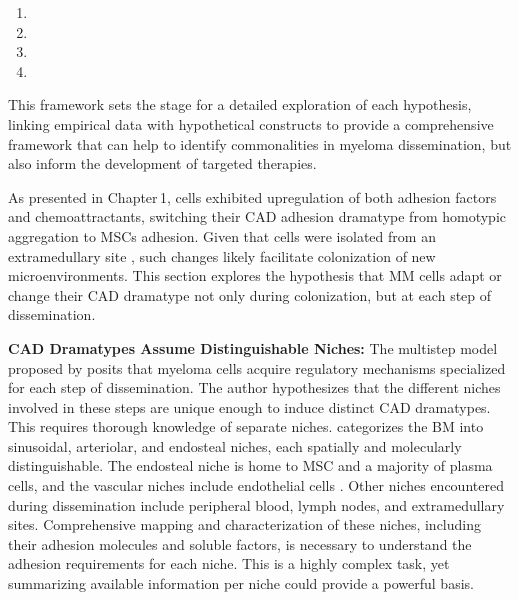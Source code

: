 \begin{enumerate}[parsep=4pt]
      \item \caddramatype
      \item \cadplasticity
      \item \cadddiversity
      \item \caddtrigger
\end{enumerate}


This framework sets the stage for a detailed exploration of each hypothesis,
linking empirical data with hypothetical constructs to provide a comprehensive
framework that can help to identify commonalities in myeloma dissemination, but
also inform the development of targeted therapies.




\unnsubsection{\caddramatypetitle}%
\label{sec:discussion_caddadaptation}%
As presented in Chapter\,1, \MAina cells exhibited upregulation of both adhesion
factors and chemoattractants, switching their \ac{CAD} adhesion
dramatype
from homotypic
aggregation to \acp{MSC} adhesion. Given that \INA cells were isolated from an
extramedullary site  \cite{burgerGp130RasMediated2001}, such
changes likely facilitate colonization of new microenvironments. This section
explores the hypothesis that MM cells adapt or change their \ac{CAD} dramatype
not only during colonization, but at each step of dissemination.


\textbf{\ac{CAD} Dramatypes Assume Distinguishable Niches:} The multistep
model proposed by \citet{zeissigTumourDisseminationMultiple2020} posits that
myeloma cells acquire regulatory mechanisms specialized for each step of
dissemination. The author hypothesizes that the different niches involved in
these steps are unique enough to induce distinct \ac{CAD} dramatypes. This
requires thorough knowledge of separate niches.
\citet{granataBoneMarrowNiches2022} categorizes the \ac{BM} into sinusoidal,
arteriolar, and endosteal niches, each spatially and molecularly
distinguishable. The endosteal niche is home to \ac{MSC} and a majority of
plasma cells, and the vascular niches
 include endothelial cells
\cite{zehentmeierStaticDynamicComponents2014, wilmoreHereThereAnywhere2017}.
Other niches encountered during dissemination include peripheral blood, lymph
nodes, and extramedullary sites. Comprehensive mapping and characterization of
these niches, including their adhesion molecules and soluble factors, is
necessary to understand the adhesion requirements for each niche. This is a
highly complex task, yet summarizing available information per niche could
provide a powerful basis.


